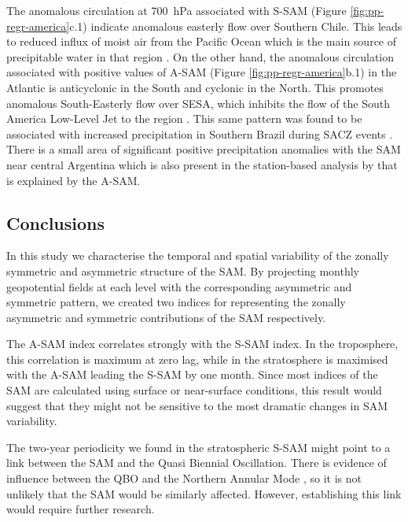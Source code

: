 \documentclass[smallextended]{svjour3}       %
\begin{document}
The anomalous circulation at 700~hPa associated with S\nobreakdash-SAM (Figure \ref{fig:pp-regr-america}c.1) indicate anomalous easterly flow over Southern Chile. This leads to reduced influx of moist air from the Pacific Ocean which is the main source of precipitable water in that region \citep[e.g.][]{garreaud2007}. On the other hand, the anomalous circulation associated with positive values of A\nobreakdash-SAM (Figure \ref{fig:pp-regr-america}b.1) in the Atlantic is anticyclonic in the South and cyclonic in the North. This promotes anomalous South-Easterly flow over SESA, which inhibits the flow of the South America Low-Level Jet to the region \citep{silvestri2009, zamboni2010}. This same pattern was found to be associated with increased precipitation in Southern Brazil during SACZ events \citep{rosso2018}. There is a small area of significant positive precipitation anomalies with the SAM near central Argentina which is also present in the station-based analysis by \citet{gillett2006} that is explained by the A\nobreakdash-SAM.

\hypertarget{conclusions}{%
\subsection{Conclusions}\label{conclusions}}

In this study we characterise the temporal and spatial variability of the zonally symmetric and asymmetric structure of the SAM. By projecting monthly geopotential fields at each level with the corresponding asymmetric and symmetric pattern, we created two indices for representing the zonally asymmetric and symmetric contributions of the SAM respectively.

The A\nobreakdash-SAM index correlates strongly with the S\nobreakdash-SAM index. In the troposphere, this correlation is maximum at zero lag, while in the stratosphere is maximised with the A\nobreakdash-SAM leading the S\nobreakdash-SAM by one month. Since most indices of the SAM are calculated using surface or near-surface conditions, this result would suggest that they might not be sensitive to the most dramatic changes in SAM variability.

The two-year periodicity we found in the stratospheric S\nobreakdash-SAM might point to a link between the SAM and the Quasi Biennial Oscillation. There is evidence of influence between the QBO and the Northern Annular Mode \citep[e.g.][]{holton1980, watson2014, zhang2020}, so it is not unlikely that the SAM would be similarly affected. However, establishing this link would require further research.
\end{document}
